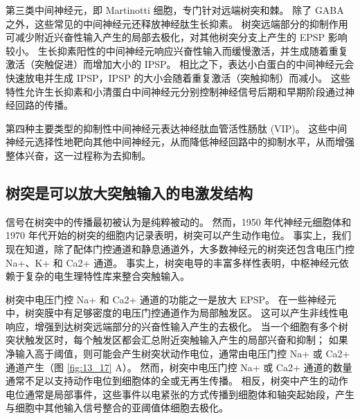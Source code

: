 第三类中间神经元，即 Martinotti 细胞，专门针对远端树突和棘。 
除了 GABA 之外，这些常见的中间神经元还释放神经肽生长抑素。 
树突远端部分的抑制作用可减少附近兴奋性输入产生的局部去极化，对其他树突分支上产生的 EPSP 影响较小。 
生长抑素阳性的中间神经元响应兴奋性输入而缓慢激活，并生成随着重复激活（突触促进）而增加大小的 IPSP。 
相比之下，表达小白蛋白的中间神经元会快速放电并生成 IPSP，IPSP 的大小会随着重复激活（突触抑制）而减小。 
这些特性允许生长抑素和小清蛋白中间神经元分别控制神经信号后期和早期阶段通过神经回路的传播。


第四种主要类型的抑制性中间神经元表达神经肽血管活性肠肽 (VIP)。 
这些中间神经元选择性地靶向其他中间神经元，从而降低神经回路中的抑制水平，从而增强整体兴奋，这一过程称为去抑制。


\subsection{树突是可以放大突触输入的电激发结构}
信号在树突中的传播最初被认为是纯粹被动的。 
然而，1950 年代神经元细胞体和 1970 年代开始的树突的细胞内记录表明，树突可以产生动作电位。 
事实上，我们现在知道，除了配体门控通道和静息通道外，大多数神经元的树突还包含电压门控 Na+、K+ 和 Ca2+ 通道。 
事实上，树突电导的丰富多样性表明，中枢神经元依赖于复杂的电生理特性库来整合突触输入。


树突中电压门控 Na+ 和 Ca2+ 通道的功能之一是放大 EPSP。 
在一些神经元中，树突膜中有足够密度的电压门控通道作为局部触发区。 
这可以产生非线性电响应，增强到达树突远端部分的兴奋性输入产生的去极化。
当一个细胞有多个树突状触发区时，每个触发区都会汇总附近突触输入产生的局部兴奋和抑制；
如果净输入高于阈值，则可能会产生树突状动作电位，通常由电压门控 Na+ 或 Ca2+ 通道产生（图 \ref{fig:13_17} A）。
然而，树突中电压门控 Na+ 或 Ca2+ 通道的数量通常不足以支持动作电位到细胞体的全或无再生传播。
相反，树突中产生的动作电位通常是局部事件，这些事件以电紧张的方式传播到细胞体和轴突起始段，产生与细胞中其他输入信号整合的亚阈值体细胞去极化。

